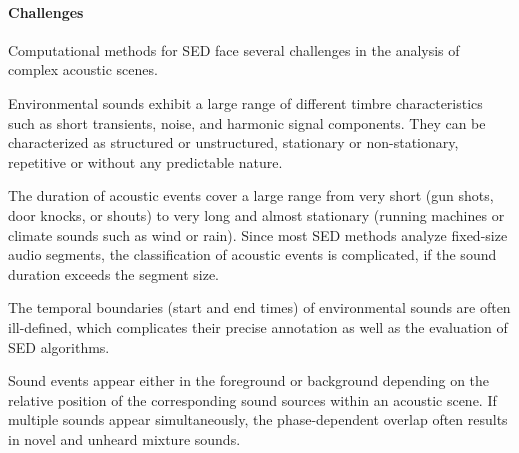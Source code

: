 \documentclass[11pt]{article}
\newenvironment{packed_enumerate}{
\begin{enumerate}[topsep=0pt, partopsep=0pt]
  \setlength{\itemsep}{0pt}
  \setlength{\parskip}{0pt}
  \setlength{\parsep}{0pt}
}{\end{enumerate}}
\begin{document}
\paragraph{Challenges}
Computational methods for SED face several challenges in the analysis of complex acoustic scenes.
\begin{packed_enumerate}
    \item Environmental sounds exhibit a large range of different timbre characteristics such as short transients, noise, and harmonic signal components.
They can be characterized as structured or unstructured, stationary or non-stationary, repetitive or without any predictable nature.
    \item The duration of acoustic events cover a large range from very short (gun shots, door knocks, or shouts) to very long and almost stationary (running machines or climate sounds such as wind or rain). Since most SED methods analyze fixed-size audio segments, the classification of acoustic events is complicated, if the sound duration exceeds the segment size.
    \item The temporal boundaries (start and end times) of environmental sounds are often ill-defined, which complicates their precise annotation as well as the evaluation of SED algorithms. 
    \item Sound events appear either in the foreground or background depending on the relative position of the corresponding sound sources within an acoustic scene.
If multiple sounds appear simultaneously, the phase-dependent overlap often results in novel and unheard mixture sounds.
\end{packed_enumerate}

\end{document}
